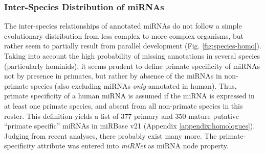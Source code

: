 \subsubsection{Inter-Species Distribution of miRNAs}
The inter-species relationships of annotated miRNAs do not follow a simple evolutionary distribution from less complex to more complex organisms, but rather seem to partially result from parallel development (Fig. \ref{fig:species-homo}). Taking into account the high probability of missing annotations in several species (particularly hominids), it seems prudent to define primate specificity of miRNAs not by presence in primates, but rather by absence of the miRNAs in non-primate species (also excluding miRNAs \emph{only} annotated in human). Thus, primate specificity of a human miRNA is assumed if the miRNA is expressed in at least one primate species, and absent from all non-primate species in this roster. This definition yields a list of 377 primary and 350 mature putative “primate specific” miRNAs in miRBase v21 (Appendix \ref{appendix:homologues}). Judging from recent analyses,\cite{Londin2015} there probably exist many more. The primate-specificity attribute was entered into \emph{miRNet} as miRNA node property.

